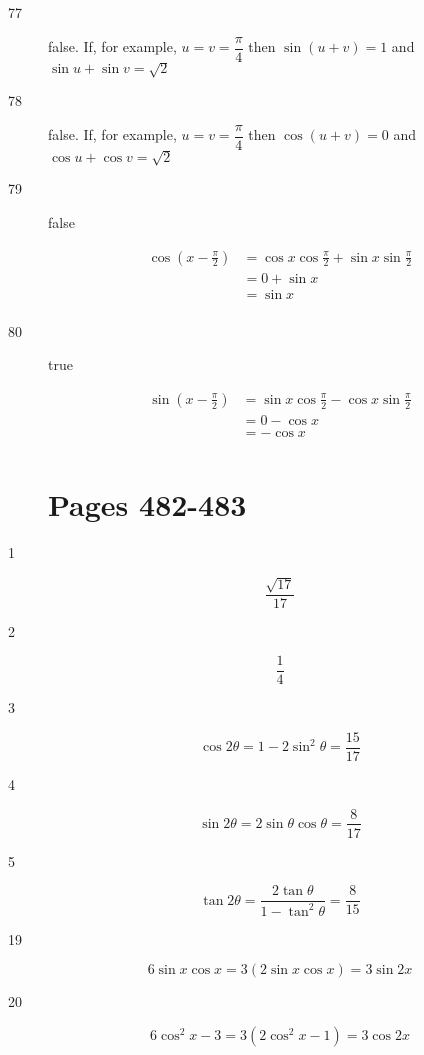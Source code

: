 \documentclass[fleqn,addpoints]{exam}
\begin{document}
\begin{description}
\item[77]
false.  If, for example, $u = v = \dfrac{\pi}{4}$ then $\sin(u + v) = 1$ and $\sin u + \sin v = \sqrt{2}$

\item[78]
false.  If, for example, $u = v = \dfrac{\pi}{4}$ then $\cos(u + v) = 0$ and $\cos u + \cos v = \sqrt{2}$

\item[79]
false

\begin{align*}
  \cos \left( x - \frac{\pi}{2} \right) &= \cos x \cos \frac{\pi}{2} + \sin x \sin \frac{\pi}{2} \\
  &= 0 + \sin x \\
  &= \sin x \\
\end{align*}

\item[80]
true

\begin{align*}
  \sin \left( x - \frac{\pi}{2} \right) &= \sin x \cos \frac{\pi}{2} - \cos x \sin \frac{\pi}{2} \\
  &= 0 - \cos x \\
  &= -\cos x \\
\end{align*}

\section{Pages 482-483}

\item[1]
\[
  \frac{\sqrt{17}}{17}
\]

\item[2]
\[
  \frac{1}{4}
\]

\item[3]
\[
  \cos 2 \theta = 1 - 2 \sin^2 \theta = \frac{15}{17}
\]

\item[4]
\[
  \sin 2 \theta =  2 \sin \theta \cos \theta = \frac{8}{17}
\]

\item[5]
\[
  \tan 2 \theta =  \frac{2 \tan \theta}{1 - \tan^2 \theta} = \frac{8}{15}
\]

\item[19]
\[
  6 \sin x \cos x = 3 (2 \sin x \cos x) = 3 \sin 2x
\]

\item[20]
\[
  6 \cos^2 x - 3 = 3(2 \cos^2 x - 1) = 3 \cos 2x 
\]


\end{description}
\end{document}
